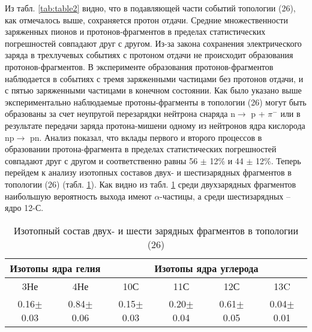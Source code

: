 \documentclass[fontsize=14pt]{scrarticle}
\begin{document}
Из табл. \ref{tab:table2} видно, что в подавляющей части событий топологии (26), как отмечалось выше, сохраняется протон отдачи. Средние множественности заряженных пионов и протонов-фрагментов в пределах статистических погрешностей совпадают друг с другом. Из-за закона сохранения электрического заряда в трехлучевых событиях с протоном отдачи не происходит образования протонов-фрагментов. В эксперименте образования протонов-фрагментов наблюдается в событиях с тремя заряженными частицами без протонов отдачи, и с пятью заряженными частицами в конечном состоянии. Как было указано выше экспериментально наблюдаемые протоны-фрагменты в топологии (26) могут быть образованы за счет неупругой перезарядки нейтрона снаряда       n$\rightarrow$ p + $\pi^{-}$ или в результате передачи заряда протона-мишени одному из нейтронов ядра кислорода np$\rightarrow$ pn. Анализ показал, что вклады первого и второго процессов в образовании протона-фрагмента в пределах статистических погрешностей совпадают друг с другом и соответственно равны 56 $\pm$ 12\% и      44 $\pm$ 12\%. Теперь перейдем к анализу изотопных составов двух- и шестизарядных фрагментов в топологии (26) (табл. \ref{tab:table3}). Как видно из табл. \ref{tab:table3} среди двухзарядных фрагментов наибольшую вероятность выхода имеют $\alpha$-частицы, а среди шестизарядных – ядро 12-С. 

\begin{table}[h]
    \centering
    \begin{tabular}{|c|c|c|c|c|c|}
    \hline
        \multicolumn{2}{|c|}{Изотопы ядра гелия}&\multicolumn{4}{c|}{Изотопы ядра углерода}\\
        \hline
        3Не&	4Не&	10С&	11С&	12С&	13C\\
        \hline
        0.16$\pm$0.03&	0.84$\pm$0.06&	0.15$\pm$0.03&	0.20$\pm$0.04&	0.61$\pm$0.05&	0.04$\pm$0.01\\ \hline

    \end{tabular}
    \caption{Изотопный состав двух- и шести зарядных фрагментов в топологии (26)}
    \label{tab:table3}
\end{table}
\end{document}
